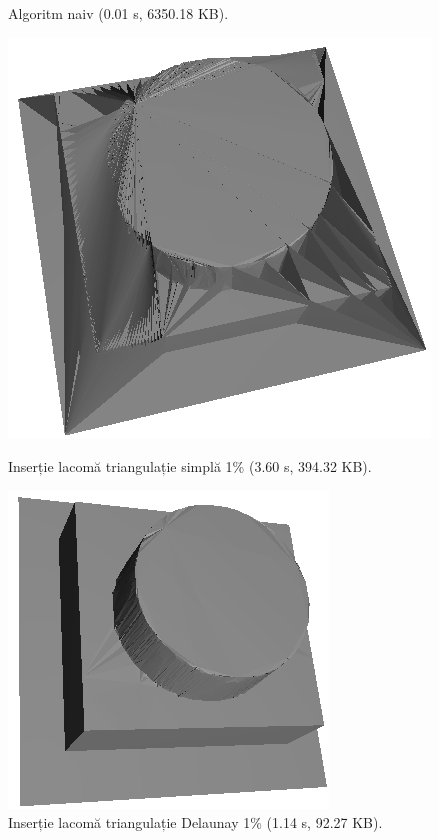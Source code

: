 \documentclass[12pt]{article}
\begin{document}
\begin{figure}[!htb]
\begin{minipage}{0.24\textwidth}
		\caption{Algoritm naiv (0.01 s, 6350.18 KB).}\label{fig:fig18}
	\end{minipage}\hfill
        \begin{minipage}{0.24\textwidth}
		\centering
		\includegraphics[width=.95\linewidth]{Turn/TurnGreedy.png}
		\caption{Inserție lacomă triangulație simplă 1\% (3.60 s, 394.32 KB).}\label{fig:fig19}
	\end{minipage}\hfill
	\begin{minipage}{0.24\textwidth}
		\centering
		\includegraphics[width=.95\linewidth]{Turn/TurnDelaunay1.png}
		\caption{Inserție lacomă triangulație Delaunay 1\% (1.14 s, 92.27 KB).}\label{fig:fig20}
	\end{minipage}\hfill
\end{figure}
\end{document}
